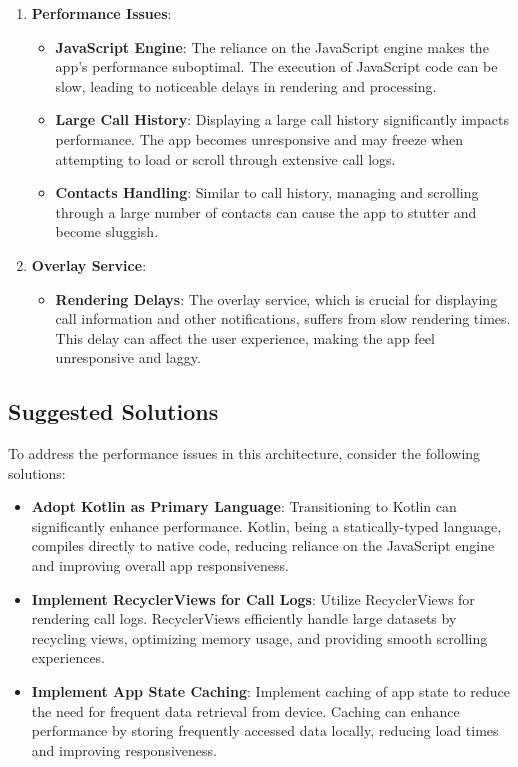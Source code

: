 \begin{enumerate}[label=\roman*.]
    \item \textbf{Performance Issues}:
    \begin{itemize}
        \item \textbf{JavaScript Engine}: The reliance on the JavaScript engine makes the app's performance suboptimal.
        The execution of JavaScript code can be slow, leading to noticeable delays in rendering and processing.
        \item \textbf{Large Call History}: Displaying a large call history significantly impacts performance.
        The app becomes unresponsive and may freeze when attempting to load or scroll through extensive call logs.
        \item \textbf{Contacts Handling}: Similar to call history, managing and scrolling through a large number of contacts can cause the app to stutter and become sluggish.
    \end{itemize}
    \item \textbf{Overlay Service}:
    \begin{itemize}
        \item \textbf{Rendering Delays}: The overlay service, which is crucial for displaying call information and other notifications, suffers from slow rendering times.
        This delay can affect the user experience, making the app feel unresponsive and laggy.
    \end{itemize}
\end{enumerate}

\subsection{Suggested Solutions}\label{subsec:suggested-solutions}

To address the performance issues in this architecture, consider the following solutions:

\begin{itemize}
    \item \textbf{Adopt Kotlin as Primary Language}: Transitioning to Kotlin can significantly enhance performance.
    Kotlin, being a statically-typed language, compiles directly to native code, reducing reliance on the JavaScript engine and improving overall app responsiveness.

    \item \textbf{Implement RecyclerViews for Call Logs}: Utilize RecyclerViews for rendering call logs.
    RecyclerViews efficiently handle large datasets by recycling views, optimizing memory usage, and providing smooth scrolling experiences.

    \item \textbf{Implement App State Caching}: Implement caching of app state to reduce the need for frequent data retrieval from device.
    Caching can enhance performance by storing frequently accessed data locally, reducing load times and improving responsiveness.
\end{itemize}

